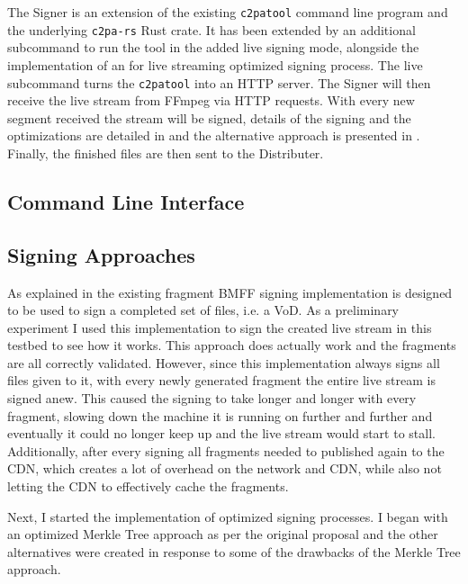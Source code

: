 The Signer is an extension of the existing \texttt{c2patool} command line program and the underlying \texttt{c2pa-rs} Rust crate. It has been extended by an additional subcommand to run the tool in the added live signing mode, alongside the implementation of an for live streaming optimized signing process. The live subcommand turns the \texttt{c2patool} into an HTTP server. The Signer will then receive the live stream from FFmpeg via HTTP requests. With every new segment received the stream will be signed, details of the signing and the optimizations are detailed in  and the alternative approach is presented in . Finally, the finished files are then sent to the Distributer.

\subsection{Command Line Interface\label{sec:cli_signer}}


\subsection{Signing Approaches\label{sec:rolling_hash}}

As explained in  the existing fragment BMFF signing implementation is designed to be used to sign a completed set of files, i.e. a VoD. As a preliminary experiment I used this implementation to sign the created live stream in this testbed to see how it works. This approach does actually work and the fragments are all correctly validated. However, since this implementation always signs all files given to it, with every newly generated fragment the entire live stream is signed anew. This caused the signing to take longer and longer with every fragment, slowing down the machine it is running on further and further and eventually it could no longer keep up and the live stream would start to stall. Additionally, after every signing all fragments needed to published again to the CDN, which creates a lot of overhead on the network and CDN, while also not letting the CDN to effectively cache the fragments.

Next, I started the implementation of optimized signing processes. I began with an optimized Merkle Tree approach as per the original proposal and the other alternatives were created in response to some of the drawbacks of the Merkle Tree approach.

